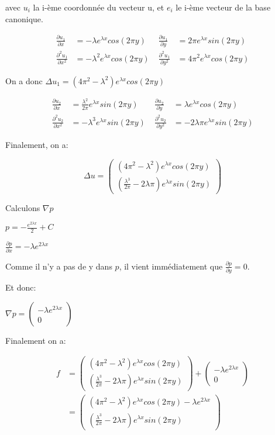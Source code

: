 \documentclass{article}
\begin{document}
avec $u_i$ la i-ème coordonnée du vecteur u, et $e_i$ le i-ème vecteur de la base canonique.

\begin{align*}
    \frac{\partial u_1}{\partial x} &= -\lambda e^{\lambda x} cos(2 \pi y)& \; \frac{\partial u_1}{\partial y} &= 2 \pi e^{\lambda x} sin(2 \pi y) \\
    \frac{\partial^2 u_1}{\partial x^2} &= - \lambda^2 e^{\lambda x} cos(2 \pi y)& \; \frac{\partial^2 u_1}{\partial y^2} &= 4 \pi^2 e^{\lambda x} cos(2 \pi y)
\end{align*}

On a donc $\Delta u_1 = (4 \pi^2-\lambda^2) e^{\lambda x} cos(2 \pi y)$

\begin{align*}
    \frac{\partial u_2}{\partial x} &= \frac{\lambda^2}{2 \pi} e^{\lambda x} sin(2 \pi y)& \; \frac{\partial u_2}{\partial y} &= \lambda e^{\lambda x} cos(2 \pi y) \\
    \frac{\partial^2 u_2}{\partial x^2} &= - \lambda^3 e^{\lambda x} sin(2 \pi y)& \; \frac{\partial^2 u_2}{\partial y^2} &= - 2 \lambda \pi e^{\lambda x} sin(2 \pi y)
\end{align*}

Finalement, on a:

$$\Delta u = \begin{pmatrix}
(4 \pi^2-\lambda^2) e^{\lambda x} cos(2 \pi y) \\
(\frac{\lambda^3}{2 \pi}-2 \lambda \pi) e^{\lambda x} sin(2 \pi y)
\end{pmatrix}$$

Calculons $\nabla p$

$p = -\frac{e^{2 \lambda x}}{2} + C$

$\frac{\partial p}{\partial x} = -\lambda e^{2 \lambda x}$

Comme il n'y a pas de y dans $p$, il vient immédiatement que $\frac{\partial p}{\partial y} = 0$.

Et donc:

$\nabla p = \begin{pmatrix}
    -\lambda e^{2 \lambda x} \\
    0
\end{pmatrix}$

Finalement on a:

\begin{align*}
    f &= \begin{pmatrix}
(4 \pi^2-\lambda^2) e^{\lambda x} cos(2 \pi y) \\
(\frac{\lambda^3}{2 \pi}-2 \lambda \pi) e^{\lambda x} sin(2 \pi y)
\end{pmatrix} + \begin{pmatrix}
    -\lambda e^{2 \lambda x} \\
    0
\end{pmatrix} \\
 &= \begin{pmatrix}
(4 \pi^2-\lambda^2) e^{\lambda x} cos(2 \pi y) -\lambda e^{2 \lambda x} \\
(\frac{\lambda^3}{2 \pi}-2 \lambda \pi) e^{\lambda x} sin(2 \pi y)
\end{pmatrix}
\end{align*}
\end{document}
